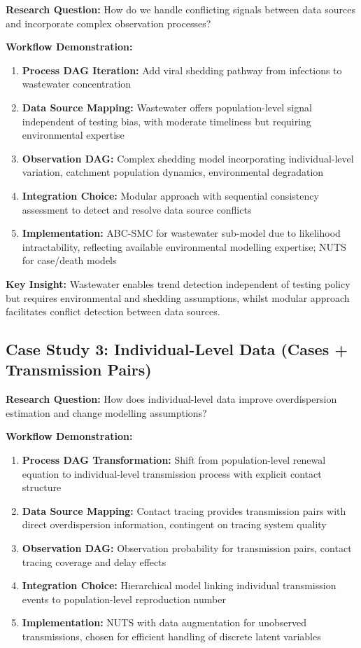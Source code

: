 \documentclass{article}
\begin{document}
\textbf{Research Question:} How do we handle conflicting signals between data sources and incorporate complex observation processes?

\textbf{Workflow Demonstration:}
\begin{enumerate}
    \item \textbf{Process DAG Iteration:} Add viral shedding pathway from infections to wastewater concentration
    \item \textbf{Data Source Mapping:} Wastewater offers population-level signal independent of testing bias, with moderate timeliness but requiring environmental expertise
    \item \textbf{Observation DAG:} Complex shedding model incorporating individual-level variation, catchment population dynamics, environmental degradation
    \item \textbf{Integration Choice:} Modular approach with sequential consistency assessment to detect and resolve data source conflicts
    \item \textbf{Implementation:} ABC-SMC for wastewater sub-model due to likelihood intractability, reflecting available environmental modelling expertise; NUTS for case/death models
\end{enumerate}

\textbf{Key Insight:} Wastewater enables trend detection independent of testing policy but requires environmental and shedding assumptions, whilst modular approach facilitates conflict detection between data sources.

\subsection{Case Study 3: Individual-Level Data (Cases + Transmission Pairs)}

\textbf{Research Question:} How does individual-level data improve overdispersion estimation and change modelling assumptions?

\textbf{Workflow Demonstration:}
\begin{enumerate}
    \item \textbf{Process DAG Transformation:} Shift from population-level renewal equation to individual-level transmission process with explicit contact structure
    \item \textbf{Data Source Mapping:} Contact tracing provides transmission pairs with direct overdispersion information, contingent on tracing system quality
    \item \textbf{Observation DAG:} Observation probability for transmission pairs, contact tracing coverage and delay effects
    \item \textbf{Integration Choice:} Hierarchical model linking individual transmission events to population-level reproduction number
    \item \textbf{Implementation:} NUTS with data augmentation for unobserved transmissions, chosen for efficient handling of discrete latent variables
\end{enumerate}
\end{document}
